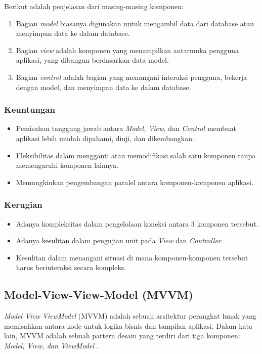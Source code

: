 \documentclass[conference]{IEEEtran}
\begin{document}
	Berikut adalah penjelasan dari masing-masing komponen:
	\begin{enumerate}[label=\alph*]
		\item Bagian \textit{model} biasanya digunakan untuk mengambil data dari database atau menyimpan data ke dalam database. 
		\item Bagian \textit{view} adalah komponen yang menampilkan antarmuka pengguna aplikasi, yang dibangun berdasarkan data model. 
		\item Bagian \textit{control} adalah bagian yang menangani interaksi pengguna, bekerja dengan model, dan menyimpan data ke dalam database.
	\end{enumerate}
	
	\subsubsection{Keuntungan}
	\begin{itemize}
		\item Pemisahan tanggung jawab antara \textit{Model, View,} dan \textit{Control} membuat aplikasi lebih mudah dipahami, diuji, dan dikembangkan.
		\item Fleksibilitas dalam mengganti atau memodifikasi salah satu komponen tanpa memengaruhi komponen lainnya.
		\item Memungkinkan pengembangan paralel antara komponen-komponen aplikasi.
	\end{itemize}
	\subsubsection{Kerugian}
	\begin{itemize}
		\item Adanya kompleksitas dalam pengelolaan koneksi antara 3 komponen tersebut.
		\item Adanya kesulitan dalam pengujian unit pada \textit{View} dan \textit{Controller}.
		\item Kesulitan dalam menangani situasi di mana komponen-komponen tersebut harus berinteraksi secara kompleks.
	\end{itemize}
	
	\subsection{Model-View-View-Model (MVVM)}
	\textit{Model View ViewModel} (MVVM) adalah sebuah arsitektur perangkat lunak yang memisahkan antara kode untuk logika bisnis dan tampilan aplikasi\cite{MVVM}. Dalam kata lain, MVVM adalah sebuah pattern desain yang terdiri dari tiga komponen: \textit{Model, View, dan ViewModel} \cite{MVVM2}.  
	
\end{document}
